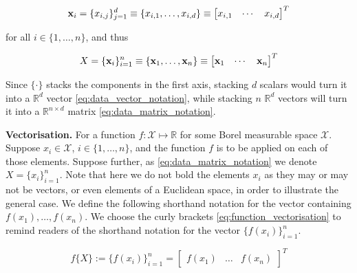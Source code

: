 \documentclass[twoside]{article} \usepackage{aistats2017}
\theoremstyle{definition}
\newcommand{\ds}[1]{{#1}}
\begin{document}
	\begin{equation}
	\mathbf{x}_{i} = \{x_{i, j}\}_{j = 1}^{d} \equiv \{x_{i, 1}, \dots, x_{i, d}\} \equiv \begin{bmatrix}
	x_{i, 1} & \cdots & x_{i, d}
	\end{bmatrix}^{T}
	\label{eq:data_vector_notation}
	\end{equation}
	
	for all $i \in \{1, \dots, n\}$, and thus

	\begin{equation}
		\ds{X} = \{\bvec{x}_{i}\}_{i = 1}^{n} \equiv \{\bvec{x}_{1}, \dots, \bvec{x}_{n}\} \equiv \begin{bmatrix}
			\bvec{x}_{1} & \cdots & \bvec{x}_{n}
		\end{bmatrix}^{T}
	\label{eq:data_matrix_notation}
	\end{equation}
		
	Since $\{ \cdot \}$ stacks the components in the first axis, stacking $d$ scalars would turn it into a $\mathbb{R}^{d}$ vector \eqref{eq:data_vector_notation}, while stacking $n$ $\mathbb{R}^{d}$ vectors will turn it into a $\mathbb{R}^{n \times d}$ matrix \eqref{eq:data_matrix_notation}.
	
	\textbf{Vectorisation.} For a function $f : \mathcal{X} \mapsto \mathbb{R}$ for some Borel measurable space $\mathcal{X}$. Suppose $x_{i} \in \mathcal{X}$, $i \in \{1, \dots, n\}$, and the function $f$ is to be applied on each of those elements. Suppose further, as \eqref{eq:data_matrix_notation} we denote $X = \{x_{i}\}_{i = 1}^{n}$. Note that here we do not bold the elements $x_{i}$ as they may or may not be vectors, or even elements of a Euclidean space, in order to illustrate the general case. We define the following shorthand notation for the vector containing $f(x_{1}), \dots, f(x_{n})$. We choose the curly brackets \eqref{eq:function_vectorisation} to remind readers of the shorthand notation for the vector $\{f(x_{i})\}_{i = 1}^{n}$.
	
	\begin{equation}
		f\{\ds{X}\} := \{f(x_{i})\}_{i = 1}^{n} = {\begin{bmatrix} f(x_{1}) & \dots & f(x_{n}) \end{bmatrix}}^{T}
	\label{eq:function_vectorisation}
	\end{equation}
	
\end{document}
